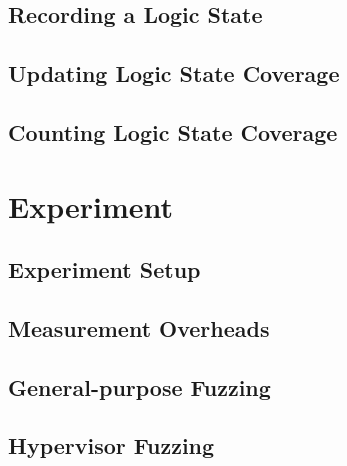 \documentclass[letterpaper,twocolumn,10pt]{article}
\begin{document}
\subsection{Recording a Logic State}
\label{s:design:rec}



\subsection{Updating Logic State Coverage}
\label{s:design:up}



\subsection{Counting Logic State Coverage}
\label{s:design:count}



\section{Experiment}

\subsection{Experiment Setup}

\subsection{Measurement Overheads}

\subsection{General-purpose Fuzzing}

\subsection{Hypervisor Fuzzing}
\end{document}
